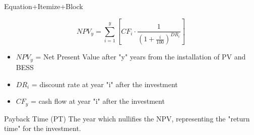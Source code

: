 \documentclass[xcolor=dvipsnames,aspectratio=169]{beamer} %
\begin{document}
\begin{frame}[noframenumbering]{Equation+Itemize+Block}

\begin{minipage}{0.9\paperwidth}

    \vspace{-32pt}
    \begin{equation*}
    NPV_y = \sum_{i=1}^{y} \left[ CF_i \cdot \frac{1}{\left(1+\frac{i}{100} \right)^{DR_i}} \right]
    \end{equation*}
    \begin{itemize}
        \item $NPV_y$ = Net Present Value after "y" years from the installation of PV and BESS
        \item $DR_i$ = discount rate at year "i" after the investment
        \item $CF_y$ = cash flow at year "i" after the investment
    \end{itemize}
    \begin{block}{Payback Time (PT)}
    The year which nullifies the NPV, representing the "return time" for the investment.
    \end{block}
    
\end{minipage}

\end{frame}
\end{document}
